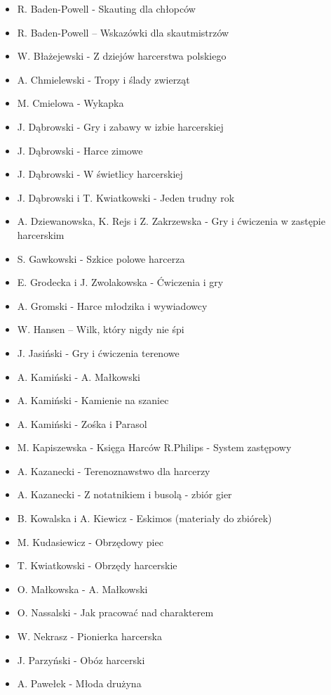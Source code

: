 \begin{multicols}{2}
\begin{itemize}[noitemsep,nolistsep] 
\small
\item	R. Baden-Powell - Skauting dla chłopców
\item	R. Baden-Powell – Wskazówki dla skautmistrzów
\item	W. Błażejewski - Z dziejów harcerstwa polskiego
\item	A. Chmielewski - Tropy i ślady zwierząt
\item	M. Cmielowa - Wykapka
\item	J. Dąbrowski - Gry i zabawy w izbie harcerskiej
\item	J. Dąbrowski - Harce zimowe
\item	J. Dąbrowski - W świetlicy harcerskiej
\item	J. Dąbrowski i T. Kwiatkowski - Jeden trudny rok
\item	A. Dziewanowska, K. Rejs i Z. Zakrzewska - Gry i ćwiczenia w zastępie harcerskim
\item	S. Gawkowski - Szkice polowe harcerza
\item	E. Grodecka i J. Zwolakowska - Ćwiczenia i gry
\item	A. Gromski - Harce młodzika i wywiadowcy
\item	W. Hansen – Wilk, który nigdy nie śpi
\item	J. Jasiński - Gry i ćwiczenia terenowe
\item	A. Kamiński - A. Małkowski
\item	A. Kamiński - Kamienie na szaniec
\item	A. Kamiński - Zośka i Parasol
\item	M. Kapiszewska - Księga Harców R.Philips - System zastępowy
\item	A. Kazanecki - Terenoznawstwo dla harcerzy
\item	A. Kazanecki - Z notatnikiem i busolą - zbiór gier
\item	B. Kowalska i A. Kiewicz - Eskimos (materiały do zbiórek)
\item	M. Kudasiewicz - Obrzędowy piec
\item	T. Kwiatkowski - Obrzędy harcerskie
\item	O. Małkowska - A. Małkowski
\item	O. Nassalski - Jak pracować nad charakterem
\item	W. Nekrasz - Pionierka harcerska
\item	J. Parzyński - Obóz harcerski
\item	A. Pawełek - Młoda drużyna

\end{itemize}
\end{multicols}

